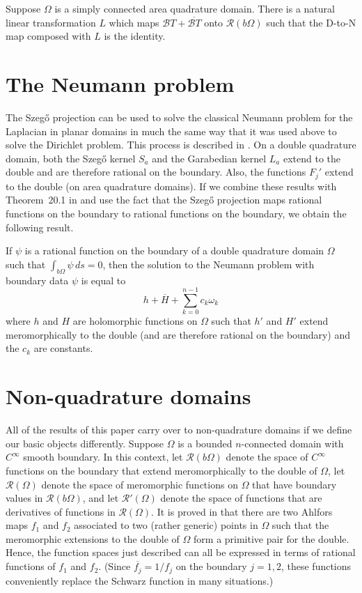 \documentclass[12pt]{amsart}
\newcommand\Om{\Omega}
\numberwithin{equation}{section}
\begin{document}
\begin{thm}
\label{inverse}
Suppose $\Om$ is a simply connected area quadrature domain.
There is a natural linear transformation $L$ which
maps ${\mathcal B}T+\overline{{\mathcal B}T}$
onto ${\mathcal R}(b\Om)$ such that the D-to-N map
composed with $L$ is the identity.
\end{thm}

\section{The Neumann problem}
\label{sec6}

The Szeg\H o projection can be used to solve the classical
Neumann problem for the Laplacian in planar domains in much
the same way that it was used above to solve the Dirichlet
problem. This process is described in \cite[p.~87]{B1}.
On a double quadrature domain, both the Szeg\H o kernel
$S_a$ and the Garabedian kernel $L_a$ extend to the double
and are therefore rational on the boundary. Also, the
functions $F_j'$ extend to the double (on area quadrature
domains).  If we combine these results with Theorem~20.1
in \cite{B1} and use the fact that the Szeg\H o projection
maps rational functions on the boundary to rational
functions on the boundary, we obtain the following result.

\begin{thm}
\label{neumann}
If $\psi$ is a rational function on the boundary of
a double quadrature domain $\Om$ such that
$\int_{b\Om}\psi\,ds=0$, then the solution to the
Neumann problem with boundary data $\psi$ is equal
to
$$h+\overline{H}+\sum_{k=0}^{n-1} c_k\omega_k$$
where $h$ and $H$ are holomorphic functions on $\Om$
such that $h'$ and $H'$ extend meromorphically to the
double (and are therefore rational on the boundary)
and the $c_k$ are constants.
\end{thm}

\section{Non-quadrature domains}
\label{sec7}

All of the results of this paper carry over to non-quadrature
domains if we define our basic objects differently. Suppose
$\Om$ is a bounded $n$-connected domain with $C^\infty$ smooth
boundary. In this context, let ${\mathcal R}(b\Om)$ denote
the space of $C^\infty$ functions on the boundary that
extend meromorphically to the double of $\Om$, let
${\mathcal R}(\Om)$ denote the space of meromorphic functions
on $\Om$ that have boundary values in
${\mathcal R}(b\Om)$, and let
${\mathcal R}'(\Om)$ denote the space of functions that are
derivatives of functions in
${\mathcal R}(\Om)$. It is proved in \cite{B1b} that there
are two Ahlfors maps $f_1$ and $f_2$ associated to two (rather
generic) points in $\Om$ such that the meromorphic extensions
to the double of $\Om$ form a primitive pair for the double.
Hence, the function spaces just described can all be
expressed in terms of rational functions of $f_1$ and $f_2$.
(Since $\overline{f_j}=1/f_j$ on the boundary $j=1,2$, these
functions conveniently replace the Schwarz function in
many situations.)
\end{document}
